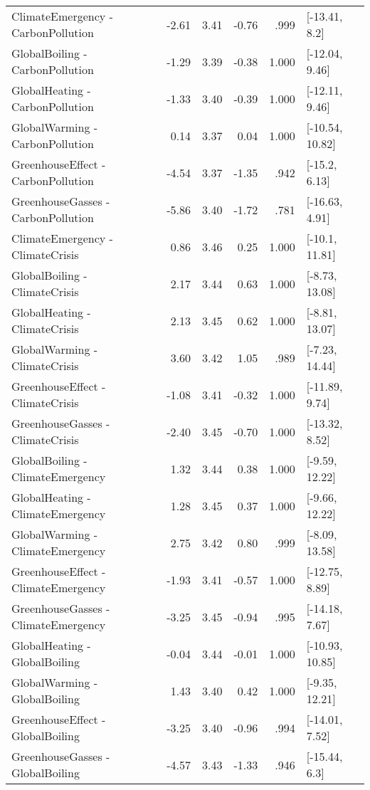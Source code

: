 \begin{table}[ht]
\begin{tabular}{lrrrrl}
  ClimateEmergency - CarbonPollution & -2.61 & 3.41 & -0.76 & .999 & [-13.41, 8.2] \\ 
  GlobalBoiling - CarbonPollution & -1.29 & 3.39 & -0.38 & 1.000 & [-12.04, 9.46] \\ 
  GlobalHeating - CarbonPollution & -1.33 & 3.40 & -0.39 & 1.000 & [-12.11, 9.46] \\ 
  GlobalWarming - CarbonPollution & 0.14 & 3.37 & 0.04 & 1.000 & [-10.54, 10.82] \\ 
  GreenhouseEffect - CarbonPollution & -4.54 & 3.37 & -1.35 & .942 & [-15.2, 6.13] \\ 
  GreenhouseGasses - CarbonPollution & -5.86 & 3.40 & -1.72 & .781 & [-16.63, 4.91] \\ 
  ClimateEmergency - ClimateCrisis & 0.86 & 3.46 & 0.25 & 1.000 & [-10.1, 11.81] \\ 
  GlobalBoiling - ClimateCrisis & 2.17 & 3.44 & 0.63 & 1.000 & [-8.73, 13.08] \\ 
  GlobalHeating - ClimateCrisis & 2.13 & 3.45 & 0.62 & 1.000 & [-8.81, 13.07] \\ 
  GlobalWarming - ClimateCrisis & 3.60 & 3.42 & 1.05 & .989 & [-7.23, 14.44] \\ 
  GreenhouseEffect - ClimateCrisis & -1.08 & 3.41 & -0.32 & 1.000 & [-11.89, 9.74] \\ 
  GreenhouseGasses - ClimateCrisis & -2.40 & 3.45 & -0.70 & 1.000 & [-13.32, 8.52] \\ 
  GlobalBoiling - ClimateEmergency & 1.32 & 3.44 & 0.38 & 1.000 & [-9.59, 12.22] \\ 
  GlobalHeating - ClimateEmergency & 1.28 & 3.45 & 0.37 & 1.000 & [-9.66, 12.22] \\ 
  GlobalWarming - ClimateEmergency & 2.75 & 3.42 & 0.80 & .999 & [-8.09, 13.58] \\ 
  GreenhouseEffect - ClimateEmergency & -1.93 & 3.41 & -0.57 & 1.000 & [-12.75, 8.89] \\ 
  GreenhouseGasses - ClimateEmergency & -3.25 & 3.45 & -0.94 & .995 & [-14.18, 7.67] \\ 
  GlobalHeating - GlobalBoiling & -0.04 & 3.44 & -0.01 & 1.000 & [-10.93, 10.85] \\ 
  GlobalWarming - GlobalBoiling & 1.43 & 3.40 & 0.42 & 1.000 & [-9.35, 12.21] \\ 
  GreenhouseEffect - GlobalBoiling & -3.25 & 3.40 & -0.96 & .994 & [-14.01, 7.52] \\ 
  GreenhouseGasses - GlobalBoiling & -4.57 & 3.43 & -1.33 & .946 & [-15.44, 6.3] \\ 

\end{tabular}
\end{table}
